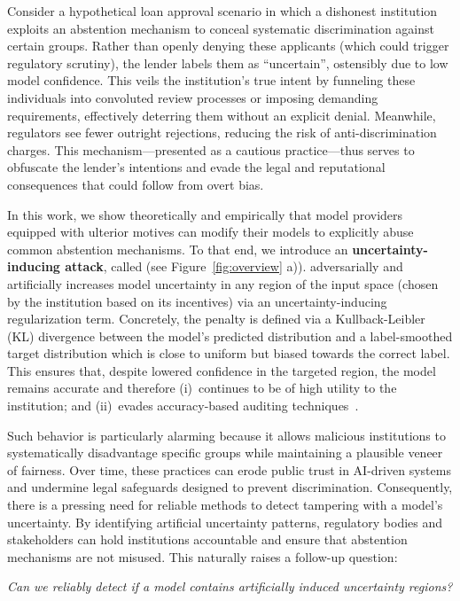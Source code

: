 Consider a hypothetical loan approval scenario in which a dishonest institution exploits an abstention mechanism to conceal systematic discrimination against certain groups. Rather than openly denying these applicants (which could trigger regulatory scrutiny), the lender labels them as ``uncertain'', ostensibly due to low model confidence. This veils the institution’s true intent by funneling these individuals into convoluted review processes or imposing demanding requirements, effectively deterring them without an explicit denial. Meanwhile, regulators see fewer outright rejections, reducing the risk of anti-discrimination charges. This mechanism---presented as a cautious practice---thus serves to obfuscate the lender’s intentions and evade the legal and reputational consequences that could follow from overt bias.

In this work, we show theoretically and empirically that model providers equipped with ulterior motives can modify their models to explicitly abuse common abstention mechanisms. To that end, we introduce an \textbf{uncertainty-inducing attack}, called \attack (see Figure~\ref{fig:overview} a)). \attack adversarially and artificially increases model uncertainty in any region of the input space (chosen by the institution based on its incentives) via an uncertainty-inducing regularization term. Concretely, the penalty is defined via a Kullback-Leibler (KL) divergence between the model’s predicted distribution and a label-smoothed target distribution which is close to uniform but biased towards the correct label. This ensures that, despite lowered confidence in the targeted region, the model remains accurate and therefore (i)~continues to be of high utility to the institution; and (ii)~evades accuracy-based auditing techniques~\citep{hardt2016equality}.

Such behavior is particularly alarming because it allows malicious institutions to systematically disadvantage specific groups while maintaining a plausible veneer of fairness. Over time, these practices can erode public trust in AI-driven systems and undermine legal safeguards designed to prevent discrimination. Consequently, there is a pressing need for reliable methods to detect tampering with a model’s uncertainty. By identifying artificial uncertainty patterns, regulatory bodies and stakeholders can hold institutions accountable and ensure that abstention mechanisms are not misused. This naturally raises a follow-up question:
\begin{center}
\textit{Can we reliably detect if a model contains artificially induced uncertainty regions?}
\end{center}

